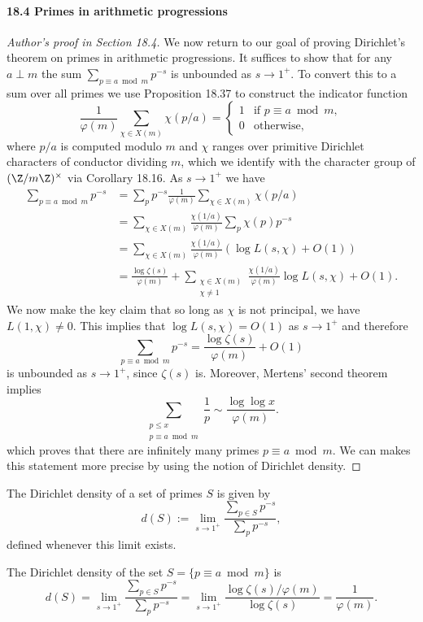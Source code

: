 \paragraph{18.4 Primes in arithmetic progressions}
\begin{proof}[Author's proof in Section 18.4]
We now return to our goal of proving Dirichlet's theorem on primes in arithmetic progressions. It suffices to show that for any $a\perp m$ the sum $\sum_{p\equiv a\bmod m}p^{-s}$ is unbounded as $s\to1^+$. To convert this to a sum over all primes we use Proposition 18.37 to construct the indicator function
\[
\frac1{\varphi(m)}\sum_{\chi\in X(m)}\chi(p/a)=
\begin{cases}1&\text{if }p\equiv a\bmod m,\\0&\text{otherwise},\end{cases}
\]
where $p/a$ is computed modulo $m$ and $\chi$ ranges over primitive Dirichlet characters of conductor dividing $m$, which we identify with the character group of $(\Z/m\Z)^\times$ via Corollary 18.16. As $s\to1^+$ we have
\begin{align*}
\sum_{p\equiv a\bmod m}p^{-s}
&=\sum_p p^{-s}\frac1{\varphi(m)}\sum_{\chi\in X(m)}\chi(p/a)\\
&=\sum_{\chi\in X(m)}\frac{\chi(1/a)}{\varphi(m)}\sum_p\chi(p)p^{-s}\\
&=\sum_{\chi\in X(m)}\frac{\chi(1/a)}{\varphi(m)}(\log L(s,\chi)+O(1))\\
&=\frac{\log\zeta(s)}{\varphi(m)}+\sum_{\substack{\chi\in X(m)\\\chi\ne1}}\frac{\chi(1/a)}{\varphi(m)}\log L(s,\chi)+O(1).
\end{align*}
We now make the key claim that so long as $\chi$ is not principal, we have $L(1,\chi)\ne0$. This implies that $\log L(s,\chi)=O(1)$ as $s\to1^+$ and therefore
\[
\sum_{p\equiv a\bmod m}p^{-s}=\frac{\log\zeta(s)}{\varphi(m)}+O(1)
\]
is unbounded as $s\to1^+$, since $\zeta(s)$ is. Moreover, Mertens' second theorem implies
\[
\sum_{\substack{p\leq x\\p\equiv a\bmod m}}\frac1p\sim\frac{\log\log x}{\varphi(m)}.
\]
which proves that there are infinitely many primes $p\equiv a\bmod m$. We can makes this statement more precise by using the notion of Dirichlet density.
\end{proof}
\begin{definition}[18.22]
The Dirichlet density of a set of primes $S$ is given by
\[
d(S):=\lim_{s\to1^+}\frac{\sum_{p\in S}p^{-s}}{\sum_pp^{-s}},
\]
defined whenever this limit exists.
\end{definition}
The Dirichlet density of the set $S=\{p\equiv a\bmod m\}$ is
\[
d(S)=\lim_{s\to1^+}\frac{\sum_{p\in S}p^{-s}}{\sum_pp^{-s}}
=\lim_{s\to1^+}\frac{\log\zeta(s)/\varphi(m)}{\log\zeta(s)}=\frac1{\varphi(m)}.
\]